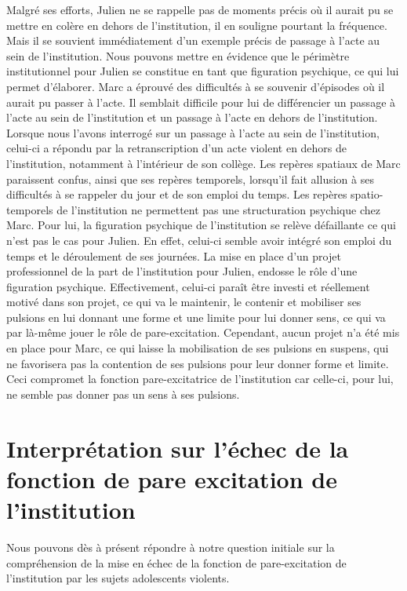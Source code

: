 \documentclass[12pt, a4paper]{book}
\begin{document}
\begin{spacing}{1.5}
Malgré ses efforts, Julien ne se rappelle pas de moments précis où il aurait pu se mettre en colère en dehors de l'institution, il en souligne pourtant la fréquence.  Mais il se souvient immédiatement d'un exemple précis de passage à l'acte au sein de l'institution. Nous pouvons mettre en évidence que le périmètre institutionnel pour Julien se constitue en tant que figuration psychique, ce qui lui permet d'élaborer. Marc a éprouvé des difficultés à se souvenir d'épisodes où il aurait pu passer à l'acte. Il semblait difficile pour lui de différencier un passage à l'acte au sein de l'institution et un passage à l'acte en dehors de l'institution. Lorsque nous l'avons interrogé sur un passage à l'acte au sein de l'institution, celui-ci a répondu par la retranscription d'un acte violent en dehors de l'institution, notamment à l'intérieur de son collège. Les repères spatiaux de Marc paraissent confus, ainsi que ses repères temporels, lorsqu'il fait allusion à ses difficultés à se rappeler du jour et de son emploi du temps. Les repères spatio-temporels de l'institution ne permettent pas une structuration psychique chez Marc. Pour lui, la figuration psychique de l'institution se relève défaillante ce qui n'est pas le cas pour Julien. En effet, celui-ci semble avoir intégré son emploi du temps et le déroulement de ses journées. La mise en place d'un projet professionnel de la part de l'institution pour Julien, endosse le rôle d'une figuration psychique. Effectivement, celui-ci paraît être investi et réellement motivé dans son projet, ce qui va le maintenir, le contenir et mobiliser ses pulsions en lui donnant une forme et une limite pour lui donner sens, ce qui va par là-même jouer le rôle de pare-excitation. Cependant, aucun projet n'a été mis en place pour Marc, ce qui laisse la mobilisation de ses pulsions en suspens, qui ne favorisera pas la contention de ses pulsions pour leur donner forme et limite.  Ceci compromet la fonction pare-excitatrice de l'institution car celle-ci, pour lui, ne semble pas donner pas un sens à ses pulsions.

\section{Interprétation sur l'échec de la fonction de pare excitation de l'institution}

Nous pouvons dès à présent répondre à notre question initiale sur la compréhension de la mise en échec de la fonction de pare-excitation de l'institution par les sujets adolescents violents. 


\end{spacing}
\end{document}
